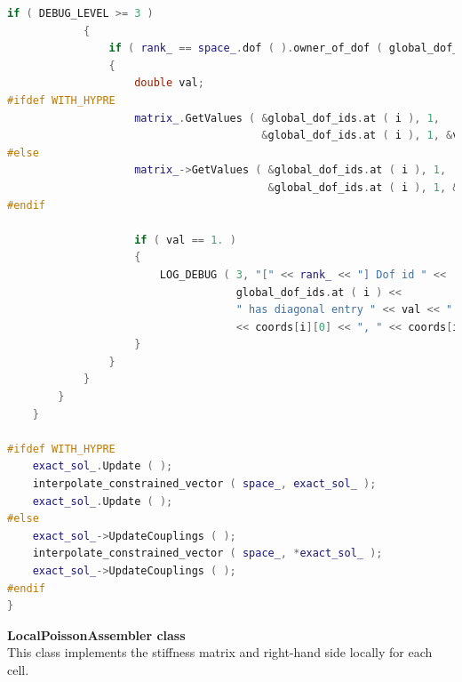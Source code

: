 \documentclass[a4paper, 11pt, twoside]{article}
\begin{document}
\begin{lstlisting}[language=C++, basicstyle={\footnotesize, \ttfamily}, keywordstyle=\color{blue}, numbers=none, tabsize=4]
            if ( DEBUG_LEVEL >= 3 )
            {
                if ( rank_ == space_.dof ( ).owner_of_dof ( global_dof_ids.at ( i ) ) )
                {
                    double val;
#ifdef WITH_HYPRE
                    matrix_.GetValues ( &global_dof_ids.at ( i ), 1, 
                                        &global_dof_ids.at ( i ), 1, &val );
#else
                    matrix_->GetValues ( &global_dof_ids.at ( i ), 1, 
                                         &global_dof_ids.at ( i ), 1, &val );
#endif

                    if ( val == 1. )
                    {
                        LOG_DEBUG ( 3, "[" << rank_ << "] Dof id " << 
                                    global_dof_ids.at ( i ) << 
                                    " has diagonal entry " << val << " and coord " 
                                    << coords[i][0] << ", " << coords[i][1] );
                    }
                }
            }
        }
    }

#ifdef WITH_HYPRE
    exact_sol_.Update ( );
    interpolate_constrained_vector ( space_, exact_sol_ );
    exact_sol_.Update ( );
#else
    exact_sol_->UpdateCouplings ( );
    interpolate_constrained_vector ( space_, *exact_sol_ );
    exact_sol_->UpdateCouplings ( );
#endif
}
\end{lstlisting} 

\textbf{LocalPoissonAssembler class}\\
This class implements the stiffness matrix and right-hand side locally for each cell.
\end{document}
